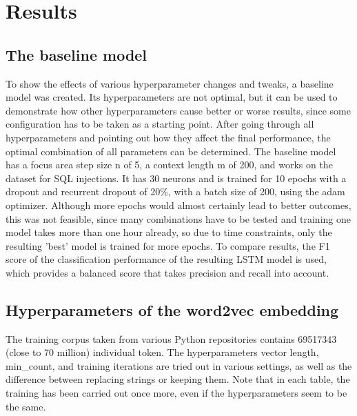 \documentclass[
a4paper,
pagesize,
pdftex,
12pt,
twoside, %
BCOR=5mm, %
ngerman,
fleqn,
final,
]{scrartcl}
\begin{document}
	
	
	\newpage
	
	\section{Results}\label{Results}
	
	\subsection{The baseline model}
	To show the effects of various hyperparameter changes and tweaks, a baseline model was created. Its hyperparameters are not optimal, but it can be used to demonstrate how other hyperparameters cause better or worse results, since some configuration has to be taken as a starting point. After going through all hyperparameters and pointing out how they affect the final performance, the optimal combination of all parameters can be determined. The baseline model has a focus area step size n of 5, a context length m of 200, and works on the dataset for SQL injections. It has 30 neurons and is trained for 10 epochs with a dropout and recurrent dropout of 20\%, with a batch size of 200, using the adam optimizer. Although more epochs would almost certainly lead to better outcomes, this was not feasible, since many combinations have to be tested and training one model takes more than one hour already, so due to time constraints, only the resulting 'best' model is trained for more epochs. To compare results, the F1 score of the classification performance of the resulting LSTM  model is used, which provides a balanced score that takes precision and recall into account.
	
	\subsection{Hyperparameters of the word2vec embedding}
	
	The training corpus taken from various Python repositories contains 69517343 (close to 70 million) individual token. The hyperparameters vector length, min\_count, and training iterations are tried out in various settings, as well as the difference between replacing strings or keeping them. Note that in each table, the training has been carried out once more, even if the hyperparameters seem to be the same.
	
\end{document}
